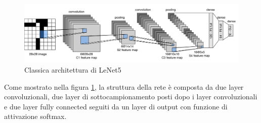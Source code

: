 \begin{figure}[H]
    \centering
    \includegraphics[width=1\textwidth]{Immagini/Generiche/1920px-LeNet-5_architecture.png}
    \caption{Classica architettura di LeNet5 \cite{LANet5_Img}}
    \label{fig:LaNet5}
\end{figure}

Come mostrato nella figura \ref{fig:LaNet5}, la struttura della rete è composta da 
due layer convoluzionali, due layer di sottocampionamento posti dopo i layer convoluzionali 
e due layer fully connected seguiti da un layer di output con funzione 
di attivazione softmax.

